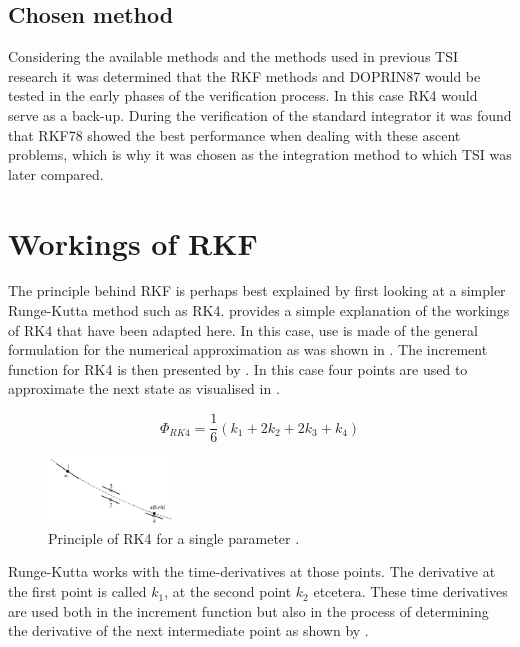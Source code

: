 \subsection{Chosen method}
\label{subsec:chosenMethod}
Considering the available methods and the methods used in previous \ac{TSI} research it was determined that the \ac{RKF} methods and \ac{DOPRIN87} would be tested in the early phases of the verification process. In this case \ac{RK4} would serve as a back-up. During the verification of the standard integrator it was found that \ac{RKF78} showed the best performance when dealing with these ascent problems, which is why it was chosen as the integration method to which \ac{TSI} was later compared.


\section{Workings of \ac{RKF}}
\label{sec:rkf}
The principle behind \ac{RKF} is perhaps best explained by first looking at a simpler Runge-Kutta method such as \ac{RK4}. \cite{noomen2013int} provides a simple explanation of the workings of \ac{RK4} that have been adapted here. In this case, use is made of the general formulation for the numerical approximation as was shown in . The increment function for \ac{RK4} is then presented by . In this case four points are used to approximate the next state as visualised in . 

\begin{equation} \label{eq:rk4_increment}
\Phi_{RK4}=\dfrac{1}{6}\left(k_{1}+2k_{2}+2k_{3}+k_{4}\right)
\end{equation}


\begin{figure}[!ht]
\centering
\includegraphics[width=0.3\textwidth]{figures/integrators/rk4_noomen2013int.jpg}
\caption{Principle of \ac{RK4} for a single parameter \cite{noomen2013int}.}
\label{fig:rk4_noomen2013int}
\end{figure}

Runge-Kutta works with the time-derivatives at those points. The derivative at the first point is called $k_{1}$, at the second point $k_{2}$ etcetera. These time derivatives are used both in the increment function but also in the process of determining the derivative of the next intermediate point as shown by .

